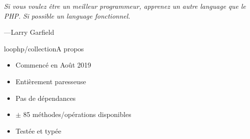 \begin{frame}
    \begin{flushleft}
        \textit{
            Si vous voulez être un meilleur programmeur, apprenez un autre language que
            le PHP. Si possible un language fonctionnel.
        }
        \begin{flushright}
            \tiny{---Larry Garfield}
        \end{flushright}
    \end{flushleft}

\end{frame}

\begin{frame}{loophp/collection}{A propos}
    \begin{itemize}[<+->]
        \item Commencé en Août 2019
        \item Entièrement paresseuse
        \item Pas de dépendances
        \item $\pm$ 85 méthodes/opérations disponibles
        \item Testée et typée
    \end{itemize}
\end{frame}

